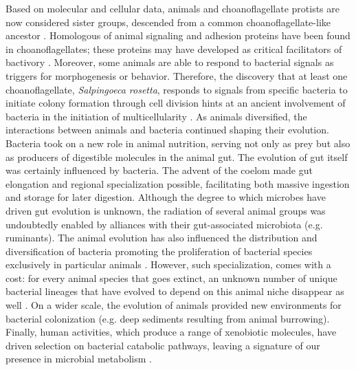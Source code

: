 Based on molecular and cellular data, animals and choanoflagellate protists are now considered sister groups, descended from a common choanoflagellate-like ancestor \cite{carr2008molecular}. Homologous of animal signaling and adhesion proteins have been found in choanoflagellates; these proteins may have developed as critical facilitators of bactivory \cite{nichols2009genomic}. Moreover, some animals are able to respond to bacterial signals as triggers for morphogenesis or behavior. Therefore, the discovery that at least one choanoflagellate, \textit{Salpingoeca rosetta}, responds to signals from specific bacteria to initiate colony formation through cell division hints at an ancient involvement of bacteria in the initiation of multicellularity \cite{alegado2012bacterial}. As animals diversified, the interactions between animals and bacteria continued shaping their evolution. Bacteria took on a new role in animal nutrition, serving not only as prey but also as producers of digestible molecules in the animal gut. The evolution of gut itself was certainly influenced by bacteria. The advent of the coelom made gut elongation and regional specialization possible, facilitating both massive ingestion and storage for later digestion. Although the degree to which microbes have driven gut evolution is unknown, the radiation of several animal groups was undoubtedly enabled by alliances with their gut-associated microbiota (e.g. ruminants). The animal evolution has also influenced the distribution and diversification of bacteria promoting the proliferation of bacterial species exclusively in particular animals \cite{hongoh2010diversity}. However, such specialization, comes with a cost: for every animal species that goes extinct, an unknown number of unique bacterial lineages that have evolved to depend on this animal niche disappear as well \cite{staley1997biodiversity}. On a wider scale, the evolution of animals provided new environments for bacterial colonization (e.g. deep sediments resulting from animal burrowing). Finally, human activities, which produce a range of xenobiotic molecules, have driven selection on bacterial catabolic pathways, leaving a signature of our presence in microbial metabolism \cite{janssen2005bacterial}.\\
